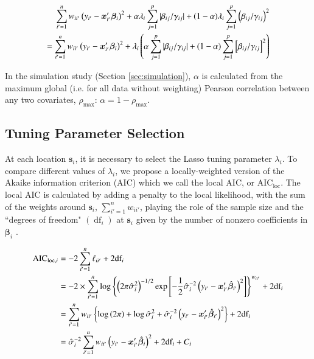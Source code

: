 \documentclass[authoryear, review, 11pt]{elsarticle}
\DeclareMathOperator*{\df}{\mbox{df}}
\begin{document}
	\begin{align}
		\sum_{i'=1}^n w_{ii'} \left(y_{i'} - \bm{x}'_{i'} \bm{\beta}_i \right)^2 + \alpha \lambda_i \sum_{j=1}^p |\beta_{ij} / \gamma_{ij}| + (1-\alpha) \lambda_i \sum_{j=1}^p  \left( \beta_{ij} / \gamma_{ij} \right)^2\notag\\
		= \sum_{i'=1}^n w_{ii'} \left(y_{i'} - \bm{x}'_{i'} \bm{\beta}_i \right)^2 + \lambda_i \left(\alpha  \sum_{j=1}^p |\beta_{ij} / \gamma_{ij}| + (1-\alpha) \sum_{j=1}^p  \left[ \beta_{ij} / \gamma_{ij} \right]^2 \right)
	\end{align}
	
	In the simulation study (Section \ref{sec:simulation}), $\alpha$ is calculated from the maximum global (i.e. for all data without weighting) Pearson correlation between any two covariates, $\rho_{\text{max}}$: $\alpha = 1-\rho_{\text{max}}$.

	\subsection{Tuning Parameter Selection}	
	At each location $\bm{s}_i$, it is necessary to select the Lasso tuning parameter $\lambda_i$. To compare different values of $\lambda_i$, we propose a locally-weighted version of the Akaike information criterion (AIC) \citep{Akaike:1974} which we call the local AIC, or $\mbox{AIC}_{\text{loc}}$. The local AIC is calculated by adding a penalty to the local likelihood, with the sum of the weights around $\bm{s}_i$, $\sum_{i'=1}^n w_{ii'}$, playing the role of the sample size and the ``degrees of freedom" $\left( \df_i \right)$ at $\bm{s}_i$ given by the number of nonzero coefficients in $\bm{\beta}_i$ \citep{Zou:2007}.
	
	\begin{align}
		\mbox{AIC}_{\text{loc}, i} &= -2 \sum_{i'=1}^n \ell_{ii'}  + 2 \mbox{df}_i\notag\\
		&= -2 \times \sum_{i'=1}^n \log \left\{ \left(2 \pi \hat{\sigma}_i^2\right)^{-1/2} \exp \left[-\frac{1}{2} \hat{\sigma}_i^{-2} \left(y_{i'} - \bm{x}_{i'}' \hat{\bm{\beta}}_{i'} \right)^2\right] \right\}^{w_{ii'}} + 2\mbox{df}_i\notag\\
		&= \sum_{i'=1}^n w_{ii'} \left\{ \log \left(2 \pi \right) + \log \hat{\sigma}_i^2 + \hat{\sigma}_i^{-2} \left(y_{i'} - \bm{x}_{i'}' \hat{\bm{\beta}}_{i'} \right)^2 \right\} + 2\mbox{df}_i \notag\\
		&= \hat{\sigma}_i^{-2} \sum_{i'=1}^n w_{ii'} \left( y_{i'} - \bm{x}'_{i'} \hat{\bm{\beta}}_i \right)^2 + 2 \mbox{df}_i + C_i
	\end{align}	
	
\end{document}
